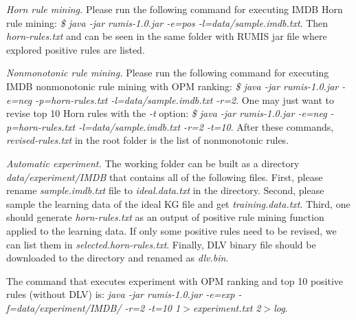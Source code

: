 \textit{Horn rule mining.} Please run the following command for executing IMDB Horn rule mining: \textit{\$ java -jar rumis-1.0.jar -e=pos -l=data/sample.imdb.txt}. Then \textit{horn-rules.txt} and can be seen in the same folder with RUMIS jar file where explored positive rules are listed.

\textit{Nonmonotonic rule mining.} Please run the following command for executing IMDB nonmonotonic rule mining with OPM ranking: \textit{\$ java -jar rumis-1.0.jar -e=neg -p=horn-rules.txt -l=data/sample.imdb.txt -r=2}. One may just want to revise top 10 Horn rules with the \textit{-t} option: \textit{\$ java -jar rumis-1.0.jar -e=neg -p=horn-rules.txt -l=data/sample.imdb.txt -r=2 -t=10}. After these commands, \textit{revised-rules.txt} in the root folder is the list of nonmonotonic rules.

\textit{Automatic experiment.} The working folder can be built as a directory \textit{data/experiment/IMDB} that contains all of the following files. First, please rename \textit{sample.imdb.txt} file to \textit{ideal.data.txt} in the directory. Second, please sample the learning data of the ideal KG file and get \textit{training.data.txt}. Third, one should generate \textit{horn-rules.txt} as an output of positive rule mining function applied to the learning data. If only some positive rules need to be revised, we can list them in \textit{selected.horn-rules.txt}. Finally, DLV binary file should be downloaded to the directory and renamed as \textit{dlv.bin}.

The command that executes experiment with OPM ranking and top 10 positive rules (without DLV) is: \textit{java -jar rumis-1.0.jar -e=exp -f=data/experiment/IMDB/ -r=2 -t=10 1$>$experiment.txt 2$>$log}.


